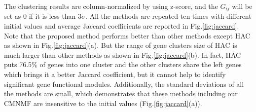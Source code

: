 \documentclass{bmcart}
\begin{document}
The clustering results are column-normalized by using z-score, and the $G_{ij}$ will be set as 0 if it is less than $3\sigma$. All the methods are repeated ten times with different initial values and average Jaccard coefficients are reported in Fig.\ref{fig:jaccard}. Note that the proposed method performs better than other methods except HAC as shown in Fig.\ref{fig:jaccard}(a). But the range of gene clusters size of HAC is much larger than other methods as shown in Fig.\ref{fig:jaccard}(b). In fact, HAC puts 76.5\% of genes into one cluster and the other clusters share the left genes which brings it a better Jaccard coefficient, but it cannot help to identify significant gene functional modules. Additionally, the standard deviations of all the methods are small, which demonstrates that these methods including our CMNMF are insensitive to the initial values (Fig.\ref{fig:jaccard}(a)).
\end{document}
